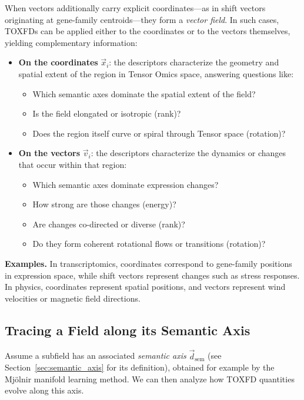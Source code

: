 \documentclass{article}
\begin{document}
When vectors additionally carry explicit coordinates---as in shift vectors 
originating at gene-family centroids---they form a \textit{vector field}.  
In such cases, TOXFDs can be applied either to the coordinates or to the 
vectors themselves, yielding complementary information:

\begin{itemize}
  \item \textbf{On the coordinates} $\vec{x}_i$:  
  the descriptors characterize the geometry and spatial extent of the region 
  in Tensor Omics space, answering questions like:
  \begin{itemize}
    \item Which semantic axes dominate the spatial extent of the field?
    \item Is the field elongated or isotropic (rank)?
    \item Does the region itself curve or spiral through Tensor space (rotation)?
  \end{itemize}

  \item \textbf{On the vectors} $\vec{v}_i$:  
  the descriptors characterize the dynamics or changes that occur within that region:
  \begin{itemize}
    \item Which semantic axes dominate expression changes?
    \item How strong are those changes (energy)?
    \item Are changes co-directed or diverse (rank)?
    \item Do they form coherent rotational flows or transitions (rotation)?
  \end{itemize}

\end{itemize}

\textbf{Examples.}  
In transcriptomics, coordinates correspond to gene-family positions in 
expression space, while shift vectors represent changes such as stress 
responses.  
In physics, coordinates represent spatial positions, and vectors represent wind 
velocities or magnetic field directions.

\subsection{Tracing a Field along its Semantic Axis}

Assume a subfield has an associated \textit{semantic axis}
\(\vec{d}_{\text{sem}}\) (see Section~\ref{sec:semantic_axis} for its definition), 
obtained for example by the Mjölnir manifold learning method.  
We can then analyze how TOXFD quantities evolve along this axis.
\end{document}

